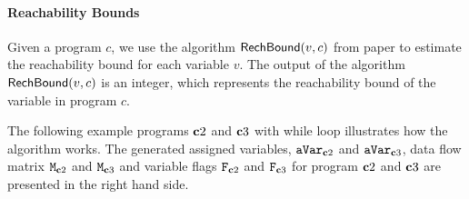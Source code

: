 \documentclass[a4paper,11pt]{article}
\begin{document}
\paragraph{Reachability Bounds}
Given a program $c$, we use the algorithm $\mathsf{RechBound}(v, c)$ from paper \cite{10.1145/1806596.1806630} to estimate the reachability bound for each variable $v$. 
The output of the algorithm $\mathsf{RechBound}(v, c)$ is an integer, which represents the reachability bound of the variable in program $c$.
%

%
The following example programs $\boldsymbol{\mathbf{c}}2$ and $\boldsymbol{\mathbf{c}}3$ with while loop illustrates how the algorithm works.
The generated assigned variables, $\mathtt{aVar}_{\boldsymbol{\mathbf{c}}2}$ and $\mathtt{aVar}_{\boldsymbol{\mathbf{c}}3}$,
data flow matrix $\mathtt{M}_{\boldsymbol{\mathbf{c}}2}$ and  $\mathtt{M}_{\boldsymbol{\mathbf{c}}3}$
and variable flags $\mathtt{F}_{\boldsymbol{\mathbf{c}}2}$ and $\mathtt{F}_{\boldsymbol{\mathbf{c}}3}$
for program $\boldsymbol{\mathbf{c}}2$ and $\boldsymbol{\mathbf{c}}3$
are presented in the right hand side.
%
\end{document}
